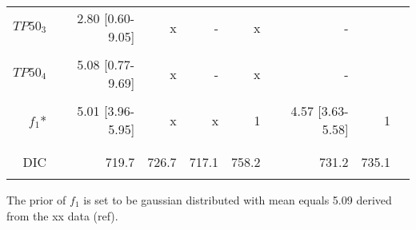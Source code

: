 \documentclass[12pt,a4paper]{article}
\begin{document}
\begin{table}[ht]
\begin{minipage}{\textwidth}
\begin{tabular}{rrrrrrrr}
   $\mathit{TP50_{3}}$ & 2.80 [0.60-9.05] &  x &-	&x &-\\ \\

   $\mathit{TP50_{4}}$ & 5.08 [0.77-9.69] &  x &-	&x &-\\ \\

   $f_{1}$*          &   5.01 [3.96-5.95] &  x &x	&1 & 4.57 [3.63-5.58] & 1\\ \\
\hline
\\ 
DIC &       719.7	 &   726.7  &  717.1 &   758.2 & 731.2 & 735.1\\ \\
\hline
\end{tabular}
\end{minipage}
\end{table}
The prior of $f_{1}$ is set to be gaussian distributed with mean equals 5.09 derived from the xx data (ref).  
\end{document}
